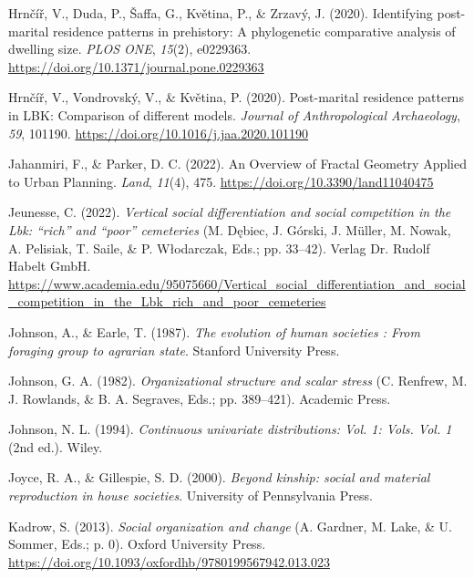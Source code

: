\documentclass[
  12pt,
]{book}
\newlength{\cslhangindent}
\newlength{\cslentryspacingunit} %
\newenvironment{CSLReferences}[2] %
 {%
  \setlength{\parindent}{0pt}
  \ifodd #1
  \let\oldpar\par
  \def\par{\hangindent=\cslhangindent\oldpar}
  \fi
  \setlength{\parskip}{#2\cslentryspacingunit}
 }%
 {}
\begin{document}
\begin{CSLReferences}{1}{0}
\leavevmode{}%
Hrnčíř, V., Duda, P., Šaffa, G., Květina, P., \& Zrzavý, J. (2020). Identifying post-marital residence patterns in prehistory: A phylogenetic comparative analysis of dwelling size. \emph{PLOS ONE}, \emph{15}(2), e0229363. \url{https://doi.org/10.1371/journal.pone.0229363}

\leavevmode{}%
Hrnčíř, V., Vondrovský, V., \& Květina, P. (2020). Post-marital residence patterns in LBK: Comparison of different models. \emph{Journal of Anthropological Archaeology}, \emph{59}, 101190. \url{https://doi.org/10.1016/j.jaa.2020.101190}

\leavevmode{}%
Jahanmiri, F., \& Parker, D. C. (2022). An Overview of Fractal Geometry Applied to Urban Planning. \emph{Land}, \emph{11}(4), 475. \url{https://doi.org/10.3390/land11040475}

\leavevmode{}%
Jeunesse, C. (2022). \emph{Vertical social differentiation and social competition in the Lbk: {``}rich{''} and {``}poor{''} cemeteries} (M. Dębiec, J. Górski, J. Müller, M. Nowak, A. Pelisiak, T. Saile, \& P. Włodarczak, Eds.; pp. 33--42). Verlag Dr. Rudolf Habelt GmbH. \url{https://www.academia.edu/95075660/Vertical_social_differentiation_and_social_competition_in_the_Lbk_rich_and_poor_cemeteries}

\leavevmode{}%
Johnson, A., \& Earle, T. (1987). \emph{The evolution of human societies : From foraging group to agrarian state}. Stanford University Press.

\leavevmode{}%
Johnson, G. A. (1982). \emph{Organizational structure and scalar stress} (C. Renfrew, M. J. Rowlands, \& B. A. Segraves, Eds.; pp. 389--421). Academic Press.

\leavevmode{}%
Johnson, N. L. (1994). \emph{Continuous univariate distributions: Vol. 1: Vols. Vol. 1} (2nd ed.). Wiley.

\leavevmode{}%
Joyce, R. A., \& Gillespie, S. D. (2000). \emph{Beyond kinship: social and material reproduction in house societies}. University of Pennsylvania Press.

\leavevmode{}%
Kadrow, S. (2013). \emph{Social organization and change} (A. Gardner, M. Lake, \& U. Sommer, Eds.; p. 0). Oxford University Press. \url{https://doi.org/10.1093/oxfordhb/9780199567942.013.023}


\end{CSLReferences}
\end{document}
